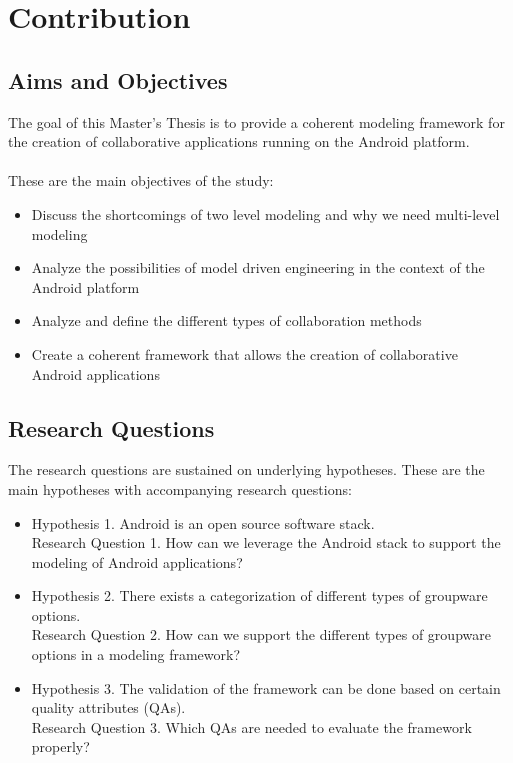\section{Contribution}

\subsection{Aims and Objectives}

The goal of this Master's Thesis is to provide a coherent modeling framework for the creation of collaborative applications running on the Android platform. 
\\ \\
These are the main objectives of the study:

\begin{itemize}
\item{Discuss the shortcomings of two level modeling and why we need multi-level modeling}
\item{Analyze the possibilities of model driven engineering in the context of the Android platform}
\item{Analyze and define the different types of collaboration methods}
\item{Create a coherent framework that allows the creation of collaborative Android applications}
\end{itemize}

\subsection{Research Questions}

The research questions are sustained on underlying hypotheses. These are the main hypotheses with accompanying research questions:

\begin{itemize}
\item{Hypothesis 1. Android is an open source software stack. \\
Research Question 1. How can we leverage the Android stack to support the modeling of Android applications?}
\item{Hypothesis 2. There exists a categorization of different types of groupware options. \\
Research Question 2. How can we support the different types of groupware options in a modeling framework?}
\item{Hypothesis 3. The validation of the framework can be done based on certain quality attributes (QAs). \\
Research Question 3. Which QAs are needed to evaluate the framework properly?}
\end{itemize}

